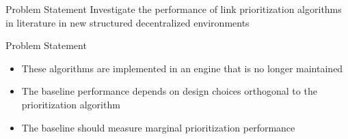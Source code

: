 
\begin{frame}{Problem Statement}
    \centering
    Investigate the performance of link prioritization algorithms in literature in new structured decentralized environments
\end{frame}

\begin{frame}{Problem Statement}
    \begin{itemize}
        \item These algorithms are implemented in an engine that is no longer maintained
        \item The baseline performance depends on design choices orthogonal to the prioritization algorithm
        \item The baseline should measure marginal prioritization performance
    \end{itemize}
\end{frame}
